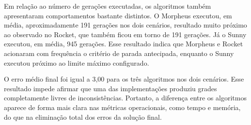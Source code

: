 Em relação ao número de gerações executadas, os algoritmos também apresentaram comportamentos bastante distintos. O Morpheus executou, em média, aproximadamente 191 gerações nos dois cenários, resultado muito próximo ao observado no Rocket, que também ficou em torno de 191 gerações. Já o Sunny executou, em média, 945 gerações. Esse resultado indica que Morpheus e Rocket acionaram com frequência o critério de parada antecipada, enquanto o Sunny executou próximo ao limite máximo configurado.

O erro médio final foi igual a 3,00 para os três algoritmos nos dois cenários. Esse resultado impede afirmar que uma das implementações produziu grades completamente livres de inconsistências. Portanto, a diferença entre os algoritmos aparece de forma mais clara nas métricas operacionais, como tempo e memória, do que na eliminação total dos erros da solução final.
